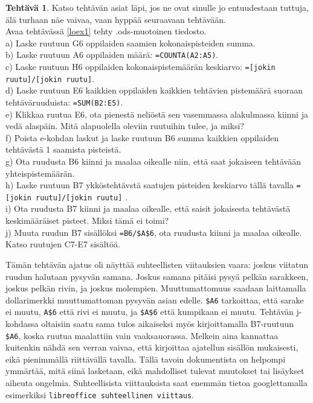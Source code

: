 \documentclass[12pt,leqno,a4paper,oneside]{amsart}
\theoremstyle{definition}
\newtheorem{exercise}{Tehtävä}
\theoremstyle{remark}
\numberwithin{equation}{section}
\begin{document}
\begin{exercise}
 Katso tehtävän asiat läpi, jos ne ovat sinulle jo entuudestaan tuttuja, älä turhaan näe vaivaa, vaan hyppää seuraavaan tehtävään.\\
 Avaa tehtävässä \ref{loex1} tehty .ods-muotoinen tiedosto.\\
 a) Laske ruutuun G6 oppilaiden saamien kokonaispisteiden summa.\\
 b) Laske ruutuun A6 oppilaiden määrä: \texttt{=COUNTA(A2:A5)}.\\
 c) Laske ruutuun H6 oppilaiden kokonaispistemäärän keskiarvo: \texttt{=[jokin ruutu]/[jokin ruutu]}.\\
 d) Laske ruutuun E6 kaikkien oppilaiden kaikkien tehtävien pistemäärä suoraan tehtäväruuduista: \texttt{=SUM(B2:E5)}.\\
 e) Klikkaa ruutua E6, ota pienestä neliöstä sen vasemmassa alakulmassa kiinni ja vedä alaspäin. Mitä alapuolella oleviin ruutuihin tulee,
 ja miksi? \\
 f) Poista e-kohdan laskut ja laske ruutuun B6 summa kaikkien oppilaiden tehtävästä 1 saamista pisteistä. \\
 g) Ota ruudusta B6 kiinni ja maalaa oikealle niin, että saat jokaiseen tehtävään yhteispistemäärän.\\
 h) Laske ruutuun B7 ykköstehtävstä saatujen pisteiden keskiarvo tällä tavalla \texttt{=[jokin ruutu]/[jokin ruutu]} .\\
 i) Ota ruudusta B7 kiinni ja maalaa oikealle, että saisit jokaisesta tehtävästä keskimääräiset pisteet. Miksi tämä ei toimi?\\
 j) Muuta ruudun B7 sisällöksi \texttt{=B6/\$A\$6}, ota ruudusta kiinni ja maalaa oikealle. Katso ruutujen C7-E7 sisältöä.
\end{exercise}

Tämän tehtävän ajatus oli näyttää suhteellisten viitauksien vaara: joskus viitatun ruudun halutaan pysyvän samana. Joskus samana pitäisi pysyä
pelkän sarakkeen, joskus pelkän rivin, ja joskus molempien. Muuttumattomuus saadaan laittamalla dollarimerkki muuttumattoman pysyvän asian edelle.
\texttt{\$A6} tarkoittaa, että sarake ei muutu, \texttt{A\$6} että rivi ei muutu, ja \texttt{\$A\$6} että kumpikaan ei muutu. Tehtävän j-kohdassa
oltaisiin saatu sama tulos aikaiseksi myös kirjoittamalla B7-ruutuun \texttt{\$A6}, koska ruutua maalattiin vain vaaksauorassa. Melkein aina kannattaa
kuitenkin nähdä sen verran vaivaa, että kirjoittaa ajatellun sisällön mukaisesti, eikä pienimmällä riittävällä tavalla. Tällä tavoin dokumentista on
helpompi ymmärtää, mitä siinä lasketaan, eikä mahdolliset tulevat muutokset tai lisäykset aiheuta ongelmia. Suhteellisista viittauksista saat enemmän
tietoa googlettamalla esimerkiksi \texttt{libreoffice suhteellinen viittaus}.
\end{document}
